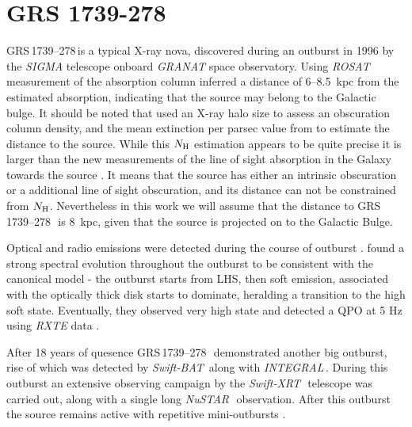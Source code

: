 \documentclass[a4paper,fleqn,usenatbib]{mnras}
\def\grs{{GRS\,1739--278\,}}
\def\swiftx{{\em Swift-XRT\,}}
\def\swiftb{{\em Swift-BAT\,}}
\def\nustar{{\em NuSTAR\,}}
\def\integral{{\em INTEGRAL\,}}
\begin{document}
\section{GRS 1739-278}

\grs is a typical X-ray nova, discovered during an outburst in 1996  \citep{paul96} by the {\it SIGMA} \citep{paul91} telescope onboard {\it GRANAT} space observatory.
Using {\it ROSAT} measurement of the absorption column \citet{greiner96} inferred a distance of 6--8.5~kpc from the estimated absorption, indicating that the source may belong to the Galactic bulge. 
It should be noted that \citet{greiner96} used an X-ray halo size to assess an obscuration column density, and the mean extinction per parsec value from \citet{1973asqu.book.....A} to estimate the distance to the source. 
While this $N_{\rm H}$ estimation appears to be quite precise it is larger than the new measurements of the line of sight absorption in the Galaxy towards the source \citep{1990ARA&A..28..215D, 2005A&A...440..775K, 2006A&A...453..635M, 2014A&A...566A.120S}. 
It means that the source has either an intrinsic obscuration or a additional line of sight obscuration,  and its distance can not be constrained from $N_{\rm H}$.
Nevertheless in this work we will assume that the distance to \grs\ is 8~kpc, given that the source is projected on to the Galactic Bulge.  

Optical and radio emissions were detected during the course of outburst \citep{hjellming96,marti97}. 
\citet{borozdin98} found a strong spectral evolution throughout the outburst to be consistent with the canonical model - the outburst starts from LHS, then soft emission, associated with the optically thick disk starts to dominate, heralding a transition to the high soft state. 
Eventually, they observed very high state and detected a QPO at 5 Hz using {\it RXTE} data \citep{borozdin00, 2001MNRAS.328..451W}.

After 18 years of quesence \grs\ demonstrated another big outburst, rise of which was detected by \swiftb \citep{krimm14_atel} along with \integral \citep{filippova14}. 
During this outburst an extensive observing campaign by the \swiftx\, telescope was carried out, along with a single long \nustar\ observation. 
After this outburst the source remains active with repetitive mini-outbursts \citep{mereminskiy17grs,yan17}.
\end{document}
